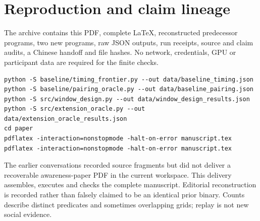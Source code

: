 \documentclass[11pt,a4paper]{article}
\theoremstyle{definition}\newtheorem{definition}{Definition}
\begin{document}
\section{Reproduction and claim lineage}
The archive contains this PDF, complete LaTeX, reconstructed predecessor programs, two new programs, raw JSON outputs, run receipts, source and claim audits, a Chinese handoff and file hashes. No network, credentials, GPU or participant data are required for the finite checks.
\begin{lstlisting}
python -S baseline/timing_frontier.py --out data/baseline_timing.json
python -S baseline/pairing_oracle.py --out data/baseline_pairing.json
python -S src/window_design.py --out data/window_design_results.json
python -S src/extension_oracle.py --out data/extension_oracle_results.json
cd paper
pdflatex -interaction=nonstopmode -halt-on-error manuscript.tex
pdflatex -interaction=nonstopmode -halt-on-error manuscript.tex
\end{lstlisting}
The earlier conversations recorded source fragments but did not deliver a recoverable awareness-paper PDF in the current workspace. This delivery assembles, executes and checks the complete manuscript. Editorial reconstruction is recorded rather than falsely claimed to be an identical prior binary. Counts describe distinct predicates and sometimes overlapping grids; replay is not new social evidence.
\end{document}
